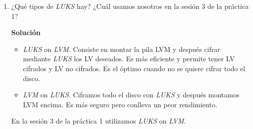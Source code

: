 \documentclass[12pt,spanish]{article}
\newenvironment{solution}{
	\par
	\textbf{Solución}
	\par
	\begin{center}
}
{
	\end{center}
}
\begin{document}
\begin{enumerate}
\begin{itemize}
		\item \textit{cp -a /var/. /newvar}
	\end{itemize}
	?
	\begin{solution}
		\begin{itemize}
			\item \textit{cp -a /var /newvar} copia la carpeta, no el contenido. Es decir, quedaría \textit{/newvar/var/archivos}
			\item \textit{cp -a /var/* /newvar} no copia los archivos ocultos.
			\item \textit{cp -a /var/. /newvar} copia todos los archivos (visibles y ocultos).
		\end{itemize}
	\end{solution}
	\item ¿Qué tipos de \textit{LUKS} hay? ¿Cuál usamos nosotros en la sesión 3 de la práctica 1?
	\begin{solution}
		\begin{itemize}
			\item \textit{LUKS} on \textit{LVM}. Consiste en montar la pila LVM y después cifrar mediante \textit{LUKS} los LV deseados. Es más eficiente y permite tener LV cifrados y LV no cifrados. Es el óptimo cuando no se quiere cifrar todo el disco.
			\item \textit{LVM} on \textit{LUKS}. Ciframos todo el disco con \textit{LUKS} y después montamos LVM encima. Es más seguro pero conlleva un peor rendimiento.
		\end{itemize}
		En la sesión 3 de la práctica 1 utilizamos \textit{LUKS} on \textit{LVM}.
	\end{solution}
\end{enumerate}
\end{document}
